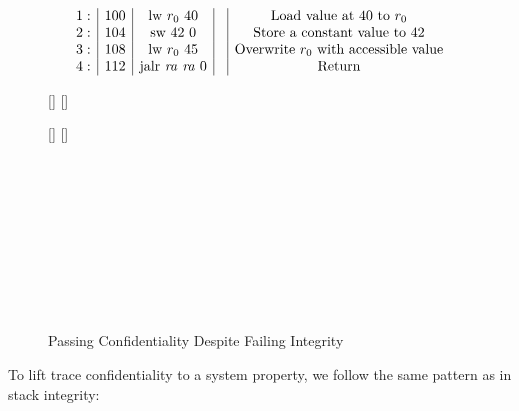 \documentclass[acmsmall,review,anonymous]{acmart}\settopmatter{printfolios=true,printccs=false,printacmref=false}
\begin{document}
\begin{figure}
  \[
  \begin{array}{r|c|c|c|c}
    1: & 100 & \text{lw} ~ r_0 ~ 40 &  & \text{Load value at 40 to $r_0$}\\
    2: & 104 & \text{sw} ~ 42 ~ 0 &  & \text{Store a constant value to 42}\\
    3: & 108 & \text{lw} ~ r_0 ~ 45 &  & \text{Overwrite $r_0$ with accessible value}\\
    4: & 112 & \text{jalr} ~ \mathit{ra} ~ \mathit{ra} ~ 0 &  & \text{Return}\\
  \end{array}
  \]

  \begin{minipage}{.49\textwidth}
    \begin{center}
      [{\makebox[0pt]{\(\HIGHSEC\)}}]%
      [{\makebox[0pt]{\(\LOWSEC\)}}]%
      \\
    \end{center}
  \end{minipage}
  \begin{minipage}{.49\textwidth}
    \begin{center}
      [{\makebox[0pt]{\(\HIGHSEC\)}}]%
      [{\makebox[0pt]{\(\LOWSEC\)}}]%
      \\
    \end{center}
  \end{minipage} \\
  ~\\
  ~\\
 \begin{minipage}{.49\textwidth}
    \begin{center}
      \\
    \end{center}
  \end{minipage}
  \begin{minipage}{.49\textwidth}
    \begin{center}
      \\
    \end{center}
  \end{minipage} \\


  \caption{Passing Confidentiality Despite Failing Integrity}
  \label{fig:lazyex2}
\end{figure}
To lift trace confidentiality to a system property, we follow the same
pattern as in stack integrity:
\end{document}
